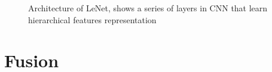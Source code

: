 \begin{figure}
	\begin{center}
		\hsize {}
	\end{center}
	\caption{Architecture of LeNet, shows a series of layers in CNN that learn hierarchical features representation \cite{lecun1998gradient} }
	\label{fig:LeNet}
\end{figure}

\section{Fusion}



